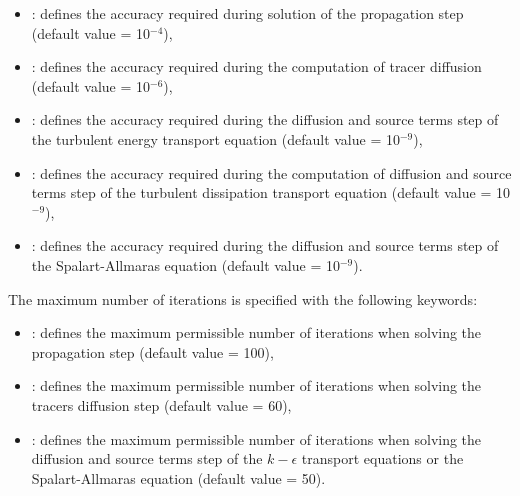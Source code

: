 \begin{itemize}
\item {} : defines the accuracy required during solution
of the propagation step (default value = 10$^{-4}$),

\item {}: defines the accuracy required
during the computation of tracer diffusion (default value = 10$^{-6}$),

\item {}: defines the accuracy required during the diffusion
and source terms step of the turbulent energy transport equation
(default value = 10$^{-9}$),

\item {}: defines the accuracy required during the
computation of diffusion and source terms step of the turbulent dissipation
transport equation (default value = 10$^{-9}$),

\item {}: defines the accuracy required
during the diffusion and source terms step of the Spalart-Allmaras equation
(default value = 10$^{-9}$).
\end{itemize}

The maximum number of iterations is specified with the following keywords:

\begin{itemize}
\item {}:
defines the maximum permissible number of iterations
when solving the propagation step (default value = 100),

\item {}:
defines the maximum permissible number of iterations
when solving the tracers diffusion step (default value = 60),

\item {}:
defines the maximum permissible number of iterations when solving the diffusion
and source terms step of the $k-\epsilon$ transport equations
or the Spalart-Allmaras equation (default value = 50).
\end{itemize}

